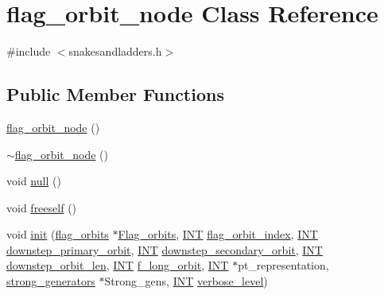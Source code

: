 \hypertarget{classflag__orbit__node}{}\section{flag\+\_\+orbit\+\_\+node Class Reference}
\label{classflag__orbit__node}


{\ttfamily \#include $<$snakesandladders.\+h$>$}

\subsection*{Public Member Functions}
\begin{DoxyCompactItemize}
\item 
\mbox{\hyperlink{classflag__orbit__node_ae86ec158a9bcf52a836a95dac275f3b8}{flag\+\_\+orbit\+\_\+node}} ()
\item 
\mbox{\hyperlink{classflag__orbit__node_a1ca48d5cc7056ec169afb72bf29a1ee9}{$\sim$flag\+\_\+orbit\+\_\+node}} ()
\item 
void \mbox{\hyperlink{classflag__orbit__node_a5f01a74db4cb9fe9d0e44f2e879280b3}{null}} ()
\item 
void \mbox{\hyperlink{classflag__orbit__node_a00fc45fda1ba153bdbd6ab8cac6f86e6}{freeself}} ()
\item 
void \mbox{\hyperlink{classflag__orbit__node_ada76817a0bfc8cc9d5db35172408d646}{init}} (\mbox{\hyperlink{classflag__orbits}{flag\+\_\+orbits}} $\ast$\mbox{\hyperlink{classflag__orbit__node_afe5983d69e15cf2d7d8a16f33a95b7b4}{Flag\+\_\+orbits}}, \mbox{\hyperlink{galois_8h_a09fddde158a3a20bd2dcadb609de11dc}{I\+NT}} \mbox{\hyperlink{classflag__orbit__node_aa13df0645e2eb436345b460735c554f6}{flag\+\_\+orbit\+\_\+index}}, \mbox{\hyperlink{galois_8h_a09fddde158a3a20bd2dcadb609de11dc}{I\+NT}} \mbox{\hyperlink{classflag__orbit__node_a8df6e2e7434213574d337cb88428d814}{downstep\+\_\+primary\+\_\+orbit}}, \mbox{\hyperlink{galois_8h_a09fddde158a3a20bd2dcadb609de11dc}{I\+NT}} \mbox{\hyperlink{classflag__orbit__node_af55a101a4db677546eff420edd4b0296}{downstep\+\_\+secondary\+\_\+orbit}}, \mbox{\hyperlink{galois_8h_a09fddde158a3a20bd2dcadb609de11dc}{I\+NT}} \mbox{\hyperlink{classflag__orbit__node_a1b8f2fccceaa719d6bd5510091e9853a}{downstep\+\_\+orbit\+\_\+len}}, \mbox{\hyperlink{galois_8h_a09fddde158a3a20bd2dcadb609de11dc}{I\+NT}} \mbox{\hyperlink{classflag__orbit__node_a2cc0567aba1a0a86900c016041fd0de6}{f\+\_\+long\+\_\+orbit}}, \mbox{\hyperlink{galois_8h_a09fddde158a3a20bd2dcadb609de11dc}{I\+NT}} $\ast$pt\+\_\+representation, \mbox{\hyperlink{classstrong__generators}{strong\+\_\+generators}} $\ast$Strong\+\_\+gens, \mbox{\hyperlink{galois_8h_a09fddde158a3a20bd2dcadb609de11dc}{I\+NT}} \mbox{\hyperlink{simeon_8_c_a818073fbcc2f439e7c56952f67386122}{verbose\+\_\+level}})

\end{DoxyCompactItemize}
